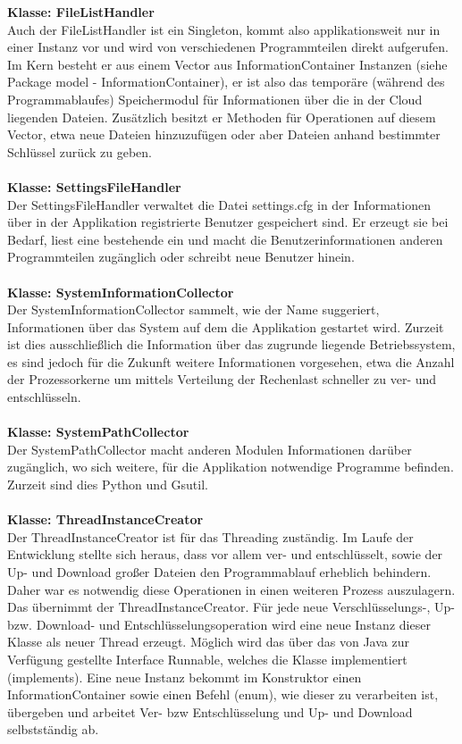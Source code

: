 \documentclass[13pt,a4paper,bibliography=totocnumbered,listof=totocnumbered]{scrartcl}
\begin{document}
\textbf{Klasse: FileListHandler}\\
Auch der FileListHandler ist ein Singleton, kommt also applikationsweit nur in einer Instanz vor und wird von verschiedenen Programmteilen direkt aufgerufen. Im Kern besteht er aus einem Vector aus InformationContainer Instanzen (siehe Package model - InformationContainer), er ist also das temporäre (während des Programmablaufes) Speichermodul für Informationen über die in der Cloud liegenden Dateien. Zusätzlich besitzt er Methoden für Operationen auf diesem Vector, etwa neue Dateien hinzuzufügen oder aber Dateien anhand bestimmter Schlüssel zurück zu geben.\\\\
\textbf{Klasse: SettingsFileHandler}\\
Der SettingsFileHandler verwaltet die Datei settings.cfg in der Informationen über in der Applikation registrierte Benutzer gespeichert sind. Er erzeugt sie bei Bedarf, liest eine bestehende ein und macht die Benutzerinformationen anderen Programmteilen zugänglich oder schreibt neue Benutzer hinein.\\\\
\textbf{Klasse: SystemInformationCollector}\\
Der SystemInformationCollector sammelt, wie der Name suggeriert, Informationen über das System auf dem die Applikation gestartet wird. Zurzeit ist dies ausschließlich die Information über das zugrunde liegende Betriebssystem, es sind jedoch für die Zukunft weitere Informationen vorgesehen, etwa die Anzahl der Prozessorkerne um mittels Verteilung der Rechenlast schneller zu ver- und entschlüsseln.\\\\
\textbf{Klasse: SystemPathCollector}\\
Der SystemPathCollector macht anderen Modulen Informationen darüber zugänglich, wo sich weitere, für die Applikation notwendige Programme befinden. Zurzeit sind dies Python und Gsutil.\\\\
\textbf{Klasse: ThreadInstanceCreator}\\
Der ThreadInstanceCreator ist für das Threading zuständig. Im Laufe der Entwicklung stellte sich heraus, dass vor allem ver- und entschlüsselt, sowie der Up- und Download großer Dateien den Programmablauf erheblich behindern. Daher war es notwendig diese Operationen in einen weiteren Prozess auszulagern. Das übernimmt der ThreadInstanceCreator. Für jede neue Verschlüsselungs-, Up- bzw. Download- und Entschlüsselungsoperation wird eine neue Instanz dieser Klasse als neuer Thread erzeugt. Möglich wird das über das von Java zur Verfügung gestellte Interface Runnable, welches die Klasse implementiert (implements). Eine neue Instanz bekommt im Konstruktor einen InformationContainer sowie einen Befehl (enum), wie dieser zu verarbeiten ist, übergeben und arbeitet Ver- bzw Entschlüsselung und Up- und Download selbstständig ab.
\end{document}
